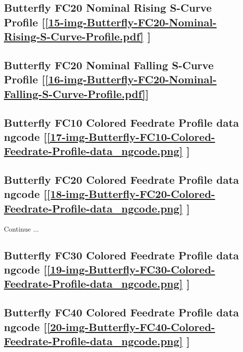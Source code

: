 \subsection     {Butterfly FC20 Nominal Rising S-Curve Profile
	[\ref      {15-img-Butterfly-FC20-Nominal-Rising-S-Curve-Profile.pdf} ] }
\label{ssec-15-img-Butterfly-FC20-Nominal-Rising-S-Curve-Profile.pdf}

\subsection     {Butterfly FC20 Nominal Falling S-Curve Profile
	[\ref      {16-img-Butterfly-FC20-Nominal-Falling-S-Curve-Profile.pdf}] }
\label{ssec-16-img-Butterfly-FC20-Nominal-Falling-S-Curve-Profile.pdf}

\subsection       {Butterfly FC10 Colored Feedrate Profile data ngcode
	[\ref      {17-img-Butterfly-FC10-Colored-Feedrate-Profile-data_ngcode.png} ] }
\label{ssec-17-img-Butterfly-FC10-Colored-Feedrate-Profile-data_ngcode.png}

\subsection       {Butterfly FC20 Colored Feedrate Profile data ngcode
	[\ref      {18-img-Butterfly-FC20-Colored-Feedrate-Profile-data_ngcode.png} ] }
\label{ssec-18-img-Butterfly-FC20-Colored-Feedrate-Profile-data_ngcode.png}

Continue ...\\

\subsection       {Butterfly FC30 Colored Feedrate Profile data ngcode
	[\ref      {19-img-Butterfly-FC30-Colored-Feedrate-Profile-data_ngcode.png} ] }
\label{ssec-19-img-Butterfly-FC30-Colored-Feedrate-Profile-data_ngcode.png}

\subsection       {Butterfly FC40 Colored Feedrate Profile data ngcode
	[\ref      {20-img-Butterfly-FC40-Colored-Feedrate-Profile-data_ngcode.png} ] }
\label{ssec-20-img-Butterfly-FC40-Colored-Feedrate-Profile-data_ngcode.png}

